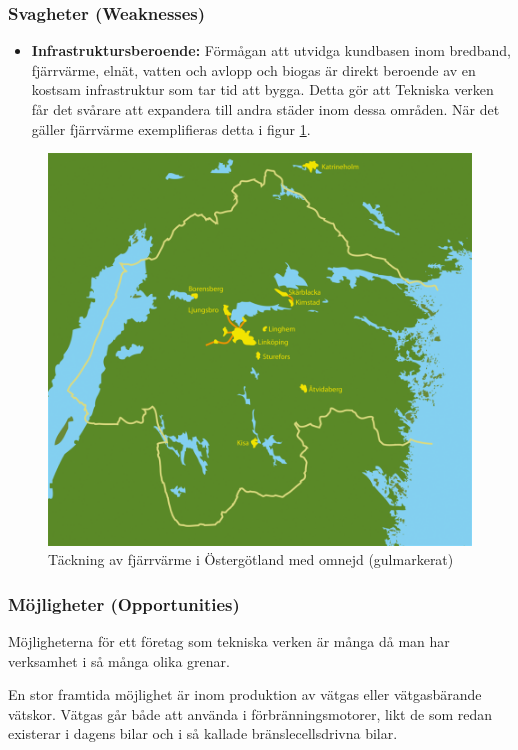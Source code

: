 \documentclass[10pt,a4paper]{article}
\begin{document}
\subsubsection{Svagheter (Weaknesses)}
\begin{itemize}
	\item \textbf{Infrastruktursberoende:}
		Förmågan att utvidga kundbasen inom bredband, fjärrvärme, elnät, vatten och avlopp och biogas är direkt beroende av en kostsam infrastruktur som tar tid att bygga. Detta gör att Tekniska verken får det svårare att expandera till andra städer inom dessa områden. När det gäller fjärrvärme exemplifieras detta i figur \ref{fig:fjarr}.
		
\end{itemize}
\begin{figure}[H] 
\centerline{\includegraphics[scale=0.5]{Bilder/teckning_fjarrvarme.png}}
\caption{Täckning av fjärrvärme i Östergötland med omnejd (gulmarkerat)}
\label{fig:fjarr}
\end{figure}  


\subsubsection{Möjligheter (Opportunities)}
Möjligheterna för ett företag som tekniska verken är många då man har verksamhet i så många olika grenar. 

En stor framtida möjlighet är inom produktion av vätgas eller vätgasbärande vätskor. Vätgas går både att använda i förbränningsmotorer, likt de som redan existerar i dagens bilar och i så kallade bränslecellsdrivna bilar. 
\end{document}
